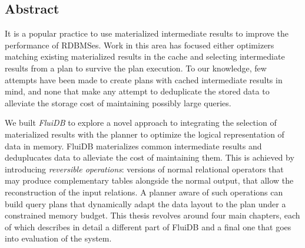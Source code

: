 \setcounter{page}{1}%

\maketitle%

\begin{precontent}
%

\chapter{Abstract}%

It is a popular practice to use materialized intermediate results to improve the performance of RDBMSes. Work in this area has focused either optimizers matching existing materialized results in the cache and selecting intermediate results from a plan to survive the plan execution. To our knowledge, few attempts have been made to create plans with cached intermediate results in mind, and none that make any attempt to deduplicate the stored data to alleviate the storage cost of maintaining possibly large queries.

We built \emph{FluiDB} to explore a novel approach to integrating the selection of materialized results with the planner to optimize the logical representation of data in memory. FluiDB materializes common intermediate results and deduplucates data to alleviate the cost of maintaining them. This is achieved by introducing \emph{reversible operations}: versions of normal relational operators that may produce complementary tables alongside the normal output, that allow the reconstruction of the input relations. A planner aware of such operations can build query plans that dynamically adapt the data layout to the plan under a constrained memory budget. This thesis revolves around four main chapters, each of which describes in detail a different part of FluiDB and a final one that goes into evaluation of the system.


\end{precontent}
